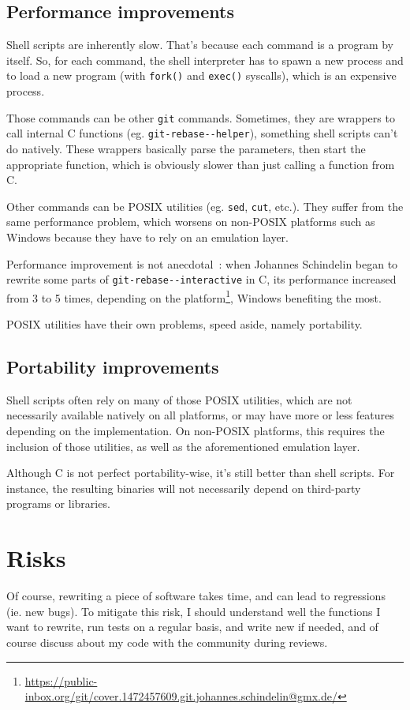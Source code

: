 \documentclass[11pt]{article}
\begin{document}
\subsection{Performance improvements}
\label{sec:orga5d3397}
Shell scripts are inherently slow. That’s because each command is a
program by itself. So, for each command, the shell interpreter has to
spawn a new process and to load a new program (with \texttt{fork()} and
\texttt{exec()} syscalls), which is an expensive process.

Those commands can be other \texttt{git} commands. Sometimes, they are
wrappers to call internal C functions (eg. \texttt{git-rebase-{}-helper}),
something shell scripts can’t do natively. These wrappers basically
parse the parameters, then start the appropriate function, which is
obviously slower than just calling a function from C.

Other commands can be POSIX utilities (eg. \texttt{sed}, \texttt{cut}, etc.). They
suffer from the same performance problem, which worsens on non-POSIX
platforms such as Windows because they have to rely on an emulation
layer.

Performance improvement is not anecdotal : when Johannes Schindelin
began to rewrite some parts of \texttt{git-rebase-{}-interactive} in C, its
performance increased from 3 to 5 times, depending on the
platform\footnote{\url{https://public-inbox.org/git/cover.1472457609.git.johannes.schindelin@gmx.de/}}, Windows benefiting the most.

POSIX utilities have their own problems, speed aside, namely
portability.

\subsection{Portability improvements}
\label{sec:org5466bf8}
Shell scripts often rely on many of those POSIX utilities, which are
not necessarily available natively on all platforms, or may have more
or less features depending on the implementation. On non-POSIX
platforms, this requires the inclusion of those utilities, as well as
the aforementioned emulation layer.

Although C is not perfect portability-wise, it’s still better than
shell scripts. For instance, the resulting binaries will not
necessarily depend on third-party programs or libraries.

\section{Risks}
\label{sec:org4b3cc30}
Of course, rewriting a piece of software takes time, and can lead to
regressions (ie. new bugs). To mitigate this risk, I should understand
well the functions I want to rewrite, run tests on a regular basis,
and write new if needed, and of course discuss about my code with the
community during reviews.
\end{document}
